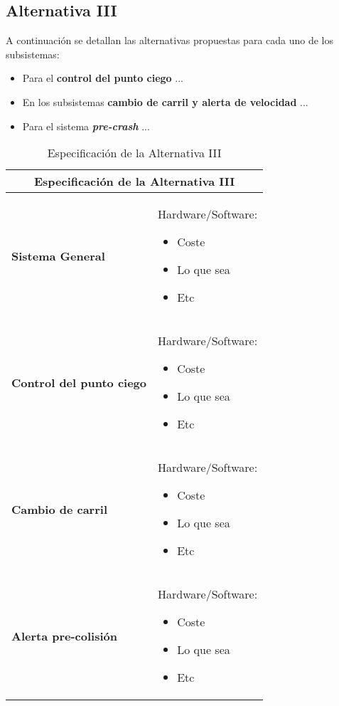 \subsection{Alternativa III}

\par A continuación se detallan las alternativas propuestas para cada uno de los subsistemas:

\begin{itemize}[-]
    \item Para el \textbf{control del punto ciego} ...
    \item En los subsistemas \textbf{cambio de carril y alerta de velocidad} ...
    \item Para el sistema \textbf{\textit{pre-crash}} ...
\end{itemize}


\begin{table}[H]
\begin{center}
\begin{tabular}{p{5cm} p{8cm}}
\multicolumn{2}{c}{\textbf{Especificación de la Alternativa III} } \\
\hline \hline

\textbf{Sistema General} &
Hardware/Software:
\begin{itemize}
    \item Coste
    \item Lo que sea
    \item Etc
\end{itemize}
\\ \hline

\textbf{Control del punto ciego} &
Hardware/Software:
\begin{itemize}
    \item Coste
    \item Lo que sea
    \item Etc
\end{itemize}
\\ \hline

\textbf{Cambio de carril} &
Hardware/Software:
\begin{itemize}
    \item Coste
    \item Lo que sea
    \item Etc
\end{itemize}
\\ \hline

\textbf{Alerta pre-colisión} &
Hardware/Software:
\begin{itemize}
    \item Coste
    \item Lo que sea
    \item Etc
\end{itemize}
\\ \hline

\end{tabular}
\caption{Especificación de la Alternativa III}
\label{tab:altIII}
\end{center}
\end{table}
